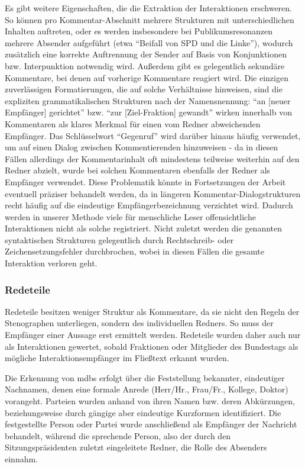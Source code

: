 Es gibt weitere Eigenschaften, die die Extraktion der Interaktionen
erschweren. So können pro Kommentar-Abschnitt mehrere Strukturen mit
unterschiedlichen Inhalten auftreten, oder es werden insbesondere bei
Publikumsresonanzen mehrere Absender aufgeführt (etwa
\enquote{Beifall von SPD und die Linke}), wodurch zusätzlich eine korrekte
Auftrennung der Sender auf Basis von Konjunktionen bzw. Interpunktion
notwendig wird. Außerdem gibt es gelegentlich sekundäre Kommentare, bei denen
auf vorherige Kommentare reagiert wird. Die einzigen zuverlässigen
Formatierungen, die auf solche Verhältnisse hinweisen, sind die expliziten
grammatikalischen Strukturen nach der Namensnennung:
\enquote{an [neuer Empfänger] gerichtet} bzw. \enquote{zur [Ziel-Fraktion] gewandt}
wirken innerhalb von Kommentaren als klares Merkmal für einen vom Redner
abweichenden Empfänger. Das Schlüsselwort \enquote{Gegenruf} wird darüber
hinaus häufig verwendet, um auf einen Dialog zwischen Kommentierenden
hinzuweisen - da in diesen Fällen allerdings der Kommentarinhalt oft
mindestens teilweise weiterhin auf den Redner abzielt, wurde bei solchen
Kommentaren ebenfalls der Redner als Empfänger verwendet. Diese
Problematik könnte in Fortsetzungen der Arbeit eventuell präziser behandelt
werden, da in längeren Kommentar-Dialogstrukturen recht häufig auf die
eindeutige Empfängerbezeichnung verzichtet wird. Dadurch werden in unserer
Methode viele für menschliche Leser offensichtliche Interaktionen nicht als
solche registriert. Nicht zuletzt werden die genannten syntaktischen
Strukturen gelegentlich durch Rechtschreib- oder Zeichensetzungsfehler
durchbrochen, wobei in diesen Fällen die gesamte Interaktion verloren geht.

\subsubsection{Redeteile}
Redeteile besitzen weniger Struktur als Kommentare, da sie nicht den Regeln der
Stenographen unterliegen, sondern des individuellen Redners. So muss der
Empfänger einer Aussage erst ermittelt werden. Redeteile wurden daher auch nur
als Interaktionen gewertet, sobald Fraktionen oder Mitglieder des Bundestags
als mögliche Interaktionsempfänger im Fließtext erkannt wurden.

Die Erkennung von \glspl{mdb} erfolgt über die Feststellung bekannter, eindeutiger
Nachnamen, denen eine formale Anrede (Herr/Hr., Frau/Fr., Kollege, Doktor)
vorangeht. Parteien wurden anhand von ihren Namen bzw. deren Abkürzungen,
beziehungsweise durch gängige aber eindeutige Kurzformen identifiziert. Die
festgestellte Person oder Partei wurde anschließend als Empfänger der Nachricht
behandelt, während die sprechende Person, also der durch den
Sitzungspräsidenten zuletzt eingeleitete Redner, die Rolle des Absenders
einnahm.

